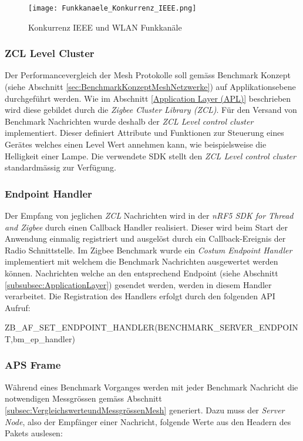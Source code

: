 \begin{figure}[h]
	\centering
	\texttt{[image: Funkkanaele\_Konkurrenz\_IEEE.png]}
	\caption{Konkurrenz IEEE und WLAN Funkkanäle \cite{markus_krause_rainer_konrad_drahtlose_2014}}
	\label{fig:KonkurrenzIEEEundWLANFunkkanäle}
\end{figure}

\subsubsection{ZCL Level Cluster}\label{subsubsec:ZCLLevelCluster}
Der Performancevergleich der Mesh Protokolle soll gemäss Benchmark Konzept (siehe Abschnitt \ref{sec:BenchmarkKonzeptMeshNetzwerke}) auf Applikationsebene durchgeführt werden.
Wie im Abschnitt \ref{Application Layer (APL)} beschrieben wird diese gebildet durch die \textit{Zigbee Cluster Library (ZCL)}.
Für den Versand von Benchmark Nachrichten wurde deshalb der \textit{ZCL Level control cluster} implementiert.
Dieser definiert Attribute und Funktionen zur Steuerung eines Gerätes welches einen Level Wert annehmen kann, wie beispielsweise die Helligkeit einer Lampe.
Die verwendete SDK stellt den \textit{ZCL Level control cluster} standardmässig zur Verfügung.\cite{the_zigbee_alliance_zigbee_2016}

\subsubsection{Endpoint Handler}\label{subsubsec:EndpointHandler}
Der Empfang von jeglichen \textit{ZCL} Nachrichten wird in der \textit{nRF5 SDK for Thread and Zigbee} durch einen Callback Handler realisiert.
Dieser wird beim Start der Anwendung einmalig registriert und ausgelöst durch ein Callback-Ereignis der Radio Schnittstelle.
Im Zigbee Benchmark wurde ein \textit{Costum Endpoint Handler} implementiert mit welchem die Benchmark Nachrichten ausgewertet werden können.
Nachrichten welche an den entsprechend Endpoint (siehe Abschnitt \ref{subsubsec:ApplicationLayer}) gesendet werden, werden in diesem Handler verarbeitet.
Die Registration des Handlers erfolgt durch den folgenden API Aufruf:

ZB\_AF\_SET\_ENDPOINT\_HANDLER(BENCHMARK\_SERVER\_ENDPOINT,\linebreak bm\_ep\_handler)

\subsubsection{APS Frame}\label{subsubsec:ZigbeeAPSFrame}
Während eines Benchmark Vorganges werden mit jeder Benchmark Nachricht die notwendigen Messgrössen gemäss Abschnitt \ref{subsec:VergleichswerteundMessgrössenMesh} generiert.
Dazu muss der \textit{Server Node}, also der Empfänger einer Nachricht, folgende Werte aus den Headern des Pakets auslesen:


